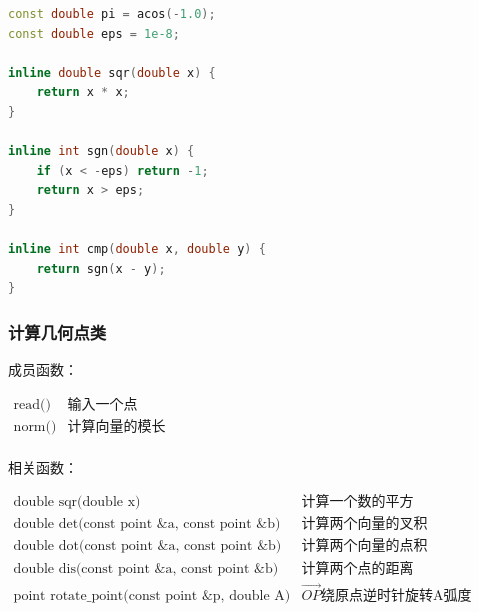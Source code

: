 \documentclass{article}
\begin{document}
\begin{lstlisting}[language=C++]
const double pi = acos(-1.0);
const double eps = 1e-8;

inline double sqr(double x) {
	return x * x;
}

inline int sgn(double x) {
	if (x < -eps) return -1;
	return x > eps;
}

inline int cmp(double x, double y) {
	return sgn(x - y);
}
\end{lstlisting}

\subsubsection{计算几何点类}

成员函数：


$
\begin{array}{lr}
	\text{read()} & \text{输入一个点} \\
	\text{norm()} & \text{计算向量的模长} \\
\end{array}
$

相关函数：

$
\begin{array}{lr}
	\text{double sqr(double x)} & \text{计算一个数的平方} \\
	\text{double det(const point \&a, const point \&b)} & \text{计算两个向量的叉积} \\
	\text{double dot(const point \&a, const point \&b)} & \text{计算两个向量的点积} \\
	\text{double dis(const point \&a, const point \&b)} & \text{计算两个点的距离} \\
	\text{point rotate\_point(const point \&p, double A)} &\overrightarrow{OP}  \text{绕原点逆时针旋转A弧度} \\
	
\end{array}
$
\end{document}
